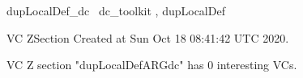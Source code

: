 \documentclass{article}
\begin{document}

\begin{zsection}	 \SECTION dupLocalDef\_dc \parents~dc\_toolkit , dupLocalDef
\end{zsection}

\newcommand{\appliesTo}{\zbinop{appliesTo}} 
\newcommand{\appliesToNofix}{\zpreop{appliesToNofix}} 

VC ZSection Created at Sun Oct 18 08:41:42 UTC 2020.



 VC Z section "dupLocalDefARGdc" has $0$ interesting VCs.



\end{document}
